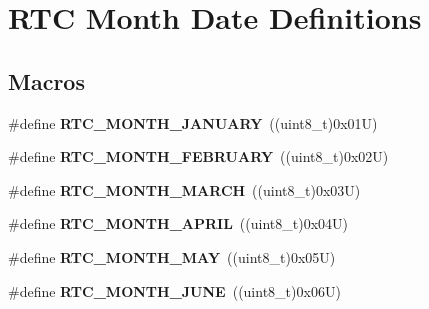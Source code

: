 \hypertarget{group___r_t_c___month___date___definitions}{}\section{R\+TC Month Date Definitions}
\label{group___r_t_c___month___date___definitions}
\subsection*{Macros}
\begin{DoxyCompactItemize}
\item 
\mbox{\label{group___r_t_c___month___date___definitions_gabc94e7ef324c7d181c54302938138aab}} 
\#define {\bfseries R\+T\+C\+\_\+\+M\+O\+N\+T\+H\+\_\+\+J\+A\+N\+U\+A\+RY}~((uint8\+\_\+t)0x01\+U)
\item 
\mbox{\label{group___r_t_c___month___date___definitions_gadcec3575c8a670a948a3929a2e9f1b6b}} 
\#define {\bfseries R\+T\+C\+\_\+\+M\+O\+N\+T\+H\+\_\+\+F\+E\+B\+R\+U\+A\+RY}~((uint8\+\_\+t)0x02\+U)
\item 
\mbox{\label{group___r_t_c___month___date___definitions_gaa0ebba4b64b5591cd434b076c922a164}} 
\#define {\bfseries R\+T\+C\+\_\+\+M\+O\+N\+T\+H\+\_\+\+M\+A\+R\+CH}~((uint8\+\_\+t)0x03\+U)
\item 
\mbox{\label{group___r_t_c___month___date___definitions_gac15a5a2164c0e536c579e7f16bd9f1b4}} 
\#define {\bfseries R\+T\+C\+\_\+\+M\+O\+N\+T\+H\+\_\+\+A\+P\+R\+IL}~((uint8\+\_\+t)0x04\+U)
\item 
\mbox{\label{group___r_t_c___month___date___definitions_ga44814b4fb8311b5842675769937129ec}} 
\#define {\bfseries R\+T\+C\+\_\+\+M\+O\+N\+T\+H\+\_\+\+M\+AY}~((uint8\+\_\+t)0x05\+U)
\item 
\mbox{\label{group___r_t_c___month___date___definitions_gad3439b4b8c19720c01ef6c35d9bb99fa}} 
\#define {\bfseries R\+T\+C\+\_\+\+M\+O\+N\+T\+H\+\_\+\+J\+U\+NE}~((uint8\+\_\+t)0x06\+U)
\item 

\end{DoxyCompactItemize}
